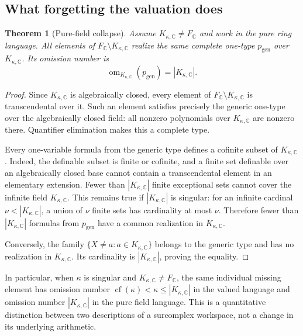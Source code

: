\documentclass[11pt,letterpaper]{article}
\numberwithin{equation}{section}
\newtheorem{theorem}{Theorem}[section]
\theoremstyle{definition}
\theoremstyle{remark}
\newcommand{\C}{\mathbb C}
\newcommand{\cf}{\operatorname{cf}}
\newcommand{\om}{\operatorname{om}}
\newcommand{\KC}{K_{\kappa,\C}}
\newcommand{\FC}{F_{\C}}
\begin{document}
\subsection{What forgetting the valuation does}
\begin{theorem}[Pure-field collapse]\label{fkc:thm:pure}
Assume $\KC\ne\FC$ and work in the pure ring language. All elements of $\FC\setminus\KC$ realize the same complete one-type $p_{\mathrm{gen}}$ over $\KC$. Its omission number is
\begin{equation}\label{fkc:eq:pureom}
 \om_{\KC}(p_{\mathrm{gen}})=|\KC|.
\end{equation}
\end{theorem}
\begin{proof}
Since $\KC$ is algebraically closed, every element of $\FC\setminus\KC$ is transcendental over it. Such an element satisfies precisely the generic one-type over the algebraically closed field: all nonzero polynomials over $\KC$ are nonzero there. Quantifier elimination makes this a complete type.

Every one-variable formula from the generic type defines a cofinite subset of $\KC$. Indeed, the definable subset is finite or cofinite, and a finite set definable over an algebraically closed base cannot contain a transcendental element in an elementary extension. Fewer than $|\KC|$ finite exceptional sets cannot cover the infinite field $\KC$. This remains true if $|\KC|$ is singular: for an infinite cardinal $\nu<|\KC|$, a union of $\nu$ finite sets has cardinality at most $\nu$. Therefore fewer than $|\KC|$ formulas from $p_{\mathrm{gen}}$ have a common realization in $\KC$.

Conversely, the family $\{X\ne a:a\in\KC\}$ belongs to the generic type and has no realization in $\KC$. Its cardinality is $|\KC|$, proving the equality.
\end{proof}

In particular, when $\kappa$ is singular and $\KC\ne\FC$, the same individual missing element has omission number $\cf(\kappa)<\kappa\le|\KC|$ in the valued language and omission number $|\KC|$ in the pure field language. This is a quantitative distinction between two descriptions of a surcomplex workspace, not a change in its underlying arithmetic.
\end{document}
